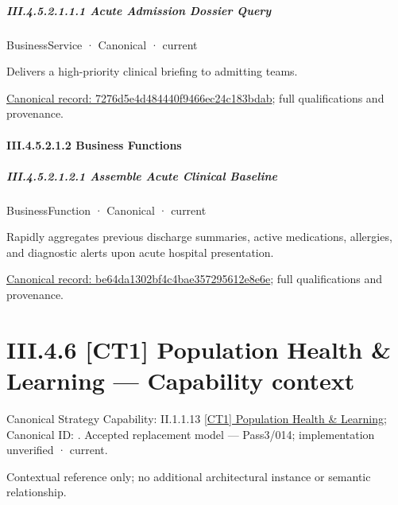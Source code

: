 \subparagraph*{III.4.5.2.1.1.1 Acute Admission Dossier Query}
\label{navigation:III.4.5.2.1.1.1}

\label{element:7276d5e4d484440f9466ec24c183bdab}
{\small BusinessService · Canonical · current}\par

Delivers a high-priority clinical briefing to admitting teams.


{\footnotesize \href{../../../../../../../continuum/business/business-service/7276d5e4d484440f9466ec24c183bdab.md}{Canonical record: 7276d5e4d484440f9466ec24c183bdab}; full qualifications and provenance.}\par
\paragraph*{III.4.5.2.1.2 Business Functions}
\label{navigation:III.4.5.2.1.2}

\subparagraph*{III.4.5.2.1.2.1 Assemble Acute Clinical Baseline}
\label{navigation:III.4.5.2.1.2.1}

\label{element:be64da1302bf4c4bae357295612e8e6e}
{\small BusinessFunction · Canonical · current}\par

Rapidly aggregates previous discharge summaries, active medications, allergies, and diagnostic alerts upon acute hospital presentation.


{\footnotesize \href{../../../../../../../continuum/business/business-function/be64da1302bf4c4bae357295612e8e6e.md}{Canonical record: be64da1302bf4c4bae357295612e8e6e}; full qualifications and provenance.}\par
\section*{III.4.6 [CT1] Population Health \& Learning — Capability context}
\label{navigation:III.4.6}

{\small Canonical Strategy Capability: II.1.1.13 \hyperref[element:171474082c704543b2e57fe37c9797ec]{[CT1] Population Health \& Learning}; Canonical ID: \texttt{}. Accepted replacement model — Pass3/014; implementation unverified · current.}\par
Contextual reference only; no additional architectural instance or semantic relationship.\par
